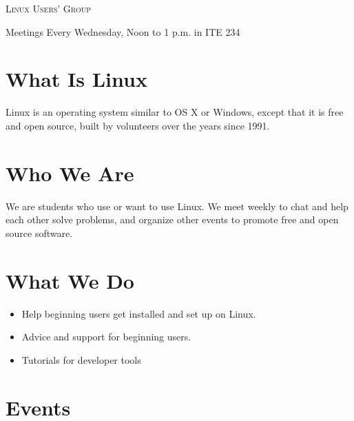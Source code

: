 \documentclass[11pt]{article}
\begin{document}
\begin{multicols*}{2}

\begin{center} \scshape \Huge
    \phantom{x}
    Linux Users' Group
\end{center}

\begin{center} \Large
    Meetings
    Every Wednesday, Noon to 1 p.m. in ITE 234
\end{center}

\section*{What Is Linux}

Linux is an operating system similar to OS X or Windows, except that it is free
and open source, built by volunteers over the years since 1991.

\section*{Who We Are}

We are students who use or want to use Linux. We meet weekly to chat and help
each other solve problems, and organize other events to promote free and open
source software.


\section*{What We Do}


\begin{itemize} \large
\item Help beginning users get installed and set up on Linux.
\item Advice and support for beginning users.
\item Tutorials for developer tools
\end{itemize}

\section*{Events}


\end{multicols*}
\end{document}
